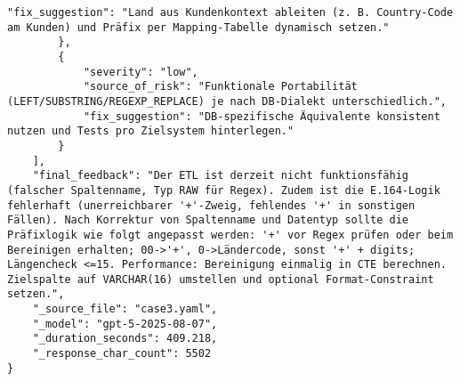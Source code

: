 \begin{lstlisting}[caption={Ausgabe: GPT-5 Anwendungsfall 3 Hauptdurchlauf},label={gpt_case3_prompt1}]
            "fix_suggestion": "Land aus Kundenkontext ableiten (z. B. Country-Code am Kunden) und Präfix per Mapping-Tabelle dynamisch setzen."
        },
        {
            "severity": "low",
            "source_of_risk": "Funktionale Portabilität (LEFT/SUBSTRING/REGEXP_REPLACE) je nach DB-Dialekt unterschiedlich.",
            "fix_suggestion": "DB-spezifische Äquivalente konsistent nutzen und Tests pro Zielsystem hinterlegen."
        }
    ],
    "final_feedback": "Der ETL ist derzeit nicht funktionsfähig (falscher Spaltenname, Typ RAW für Regex). Zudem ist die E.164-Logik fehlerhaft (unerreichbarer '+'-Zweig, fehlendes '+' in sonstigen Fällen). Nach Korrektur von Spaltenname und Datentyp sollte die Präfixlogik wie folgt angepasst werden: '+' vor Regex prüfen oder beim Bereinigen erhalten; 00->'+', 0->Ländercode, sonst '+' + digits; Längencheck <=15. Performance: Bereinigung einmalig in CTE berechnen. Zielspalte auf VARCHAR(16) umstellen und optional Format-Constraint setzen.",
    "_source_file": "case3.yaml",
    "_model": "gpt-5-2025-08-07",
    "_duration_seconds": 409.218,
    "_response_char_count": 5502
}
\end{lstlisting}

